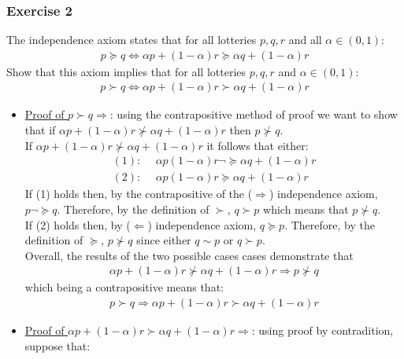 \documentclass{article}
\begin{document}
\subsubsection{Exercise 2}
The independence axiom states that for all lotteries $p,q,r $ and all $\alpha \in (0,1)$:
\begin{gather*}
  p \succeq q \Leftrightarrow \alpha p + (1-\alpha)r \succeq \alpha q + (1-\alpha)r
\end{gather*}
Show that this axiom implies that for all lotteries $p,q,r$ and $\alpha \in (0,1)$:
\begin{gather*}
  p \succ q \Leftrightarrow \alpha p + (1-\alpha)r \succ \alpha q + (1-\alpha)r
\end{gather*}
\par \vspace{0.3em}
  \begin{itemize}
    \item  \underline{Proof of $p \succ q \Rightarrow$}: using the contrapositive method of proof we want to show that if $\alpha p + (1 - \alpha) r \nsucc \alpha q + (1- \alpha)r$ then $p \nsucc q$. \\
    If $\alpha p + (1 - \alpha) r \nsucc \alpha q + (1- \alpha)r$ it follows that either:
    \begin{align*}
      (1):& \ \ \alpha p (1-\alpha)r \lnot \succeq \alpha q + (1-\alpha) r \\
      (2):& \ \ \alpha p (1-\alpha)r \succeq \alpha q + (1-\alpha) r
    \end{align*}
    If (1) holds then, by the contrapositive of the ($\Rightarrow$) independence axiom, $p \lnot \succeq q$. Therefore, by the definition of $\succ$, $q \succ p$ which means that $p \nsucc q$. \\
    If (2) holds then, by ($\Leftarrow$) independence axiom, $q \succeq p$. Therefore, by the definition of $\succeq$, $p \nsucc q$ since either $q \sim p$ or $q \succ p$. \\
    Overall, the results of the two possible cases cases demonstrate that
    \begin{gather*}
      \alpha p + (1 - \alpha) r \nsucc \alpha q + (1- \alpha)r  \Rightarrow p \nsucc q
    \end{gather*}
    which being a contrapositive means that:
    \begin{gather*}
      p \succ q \Rightarrow \alpha p + (1-\alpha)r \succ \alpha q + (1-\alpha)r
    \end{gather*}
    \item  \underline{Proof of $\alpha p + (1-\alpha)r \succ \alpha q + (1-\alpha)r \Rightarrow$}: using proof by contradition, suppose that:

\end{itemize}
\end{document}
